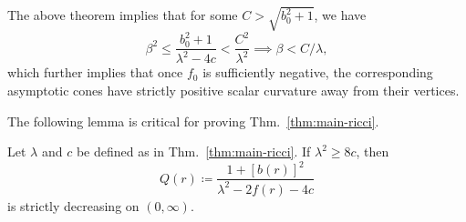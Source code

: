 \documentclass[11pt,letterpaper]{article}
\begin{document}
The above theorem implies that for some $C > \sqrt{b_0^2 + 1}$, we have
\[
    \beta^2 \le \frac{b_0^2 + 1}{\lambda^2 - 4c} < \frac{C^2}{\lambda^2} \implies \beta < C / \lambda,
\]
which further implies that once $f_0$ is sufficiently negative, the corresponding asymptotic cones have strictly positive scalar curvature away from their vertices.

\newpar

The following lemma is critical for proving Thm.~\ref{thm:main-ricci}.

\begin{lemma} \label{lem:monotone-q}
    Let $\lambda$ and $c$ be defined as in Thm.~\ref{thm:main-ricci}. If $\lambda^2 \ge 8c$, then \[ Q(r) \coloneq \frac{1 + [b(r)]^2}{\lambda^2 - 2f(r) - 4c} \] is strictly decreasing on $(0, \infty)$.
\end{lemma}
\end{document}
